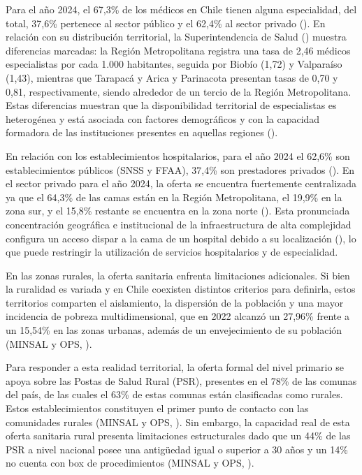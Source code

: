 \documentclass[
  spanish,
  a4paper,
  oneside]{scrbook}
\begin{document}
Para el año 2024, el 67,3\% de los médicos en Chile tienen alguna
especialidad, del total, 37,6\% pertenece al sector público y el 62,4\%
al sector privado
(). En relación con su distribución territorial, la Superintendencia
de Salud ()
muestra diferencias marcadas: la Región Metropolitana registra una tasa
de 2,46 médicos especialistas por cada 1.000 habitantes, seguida por
Biobío (1,72) y Valparaíso (1,43), mientras que Tarapacá y Arica y
Parinacota presentan tasas de 0,70 y 0,81, respectivamente, siendo
alrededor de un tercio de la Región Metropolitana. Estas diferencias
muestran que la disponibilidad territorial de especialistas es
heterogénea y está asociada con factores demográficos y con la capacidad
formadora de las instituciones presentes en aquellas regiones
().

En relación con los establecimientos hospitalarios, para el año 2024 el
62,6\% son establecimientos públicos (SNSS y FFAA), 37,4\% son
prestadores privados
(). En el sector privado para el año 2024, la oferta se encuentra
fuertemente centralizada ya que el 64,3\% de las camas están en la
Región Metropolitana, el 19,9\% en la zona sur, y el 15,8\% restante se
encuentra en la zona norte
(). Esta pronunciada concentración geográfica e institucional de la
infraestructura de alta complejidad configura un acceso dispar a la cama
de un hospital debido a su localización
(), lo
que puede restringir la utilización de servicios hospitalarios y de
especialidad.

En las zonas rurales, la oferta sanitaria enfrenta limitaciones
adicionales. Si bien la ruralidad es variada y en Chile coexisten
distintos criterios para definirla, estos territorios comparten el
aislamiento, la dispersión de la población y una mayor incidencia de
pobreza multidimensional, que en 2022 alcanzó un 27,96\% frente a un
15,54\% en las zonas urbanas, además de un envejecimiento de su
población (MINSAL y OPS,
).

Para responder a esta realidad territorial, la oferta formal del nivel
primario se apoya sobre las Postas de Salud Rural (PSR), presentes en el
78\% de las comunas del país, de las cuales el 63\% de estas comunas
están clasificadas como rurales. Estos establecimientos constituyen el
primer punto de contacto con las comunidades rurales (MINSAL y OPS,
). Sin embargo, la
capacidad real de esta oferta sanitaria rural presenta limitaciones
estructurales dado que un 44\% de las PSR a nivel nacional posee una
antigüedad igual o superior a 30 años y un 14\% no cuenta con box de
procedimientos (MINSAL y OPS,
).
\end{document}
